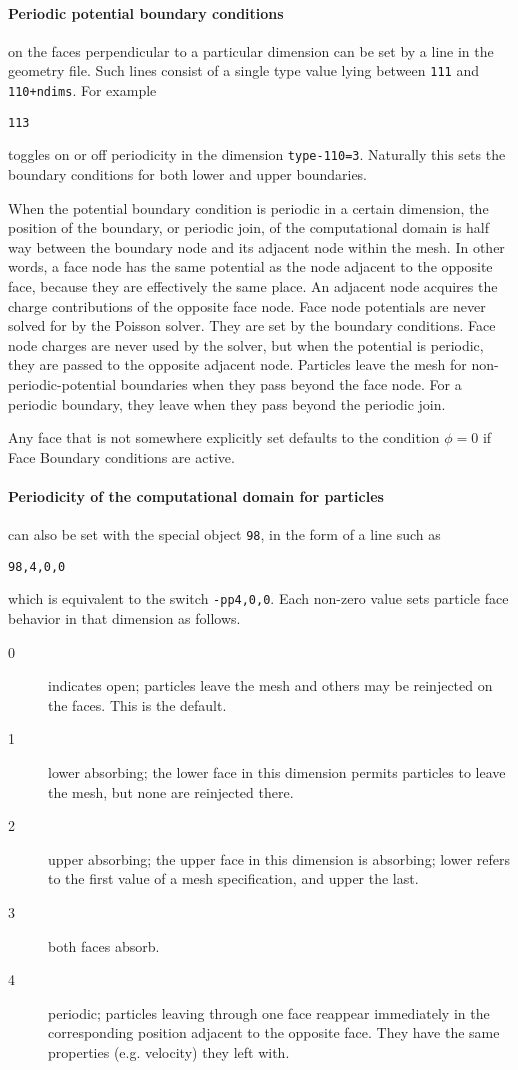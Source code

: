 \documentclass[12pt]{article}
\begin{document}
\paragraph{Periodic potential boundary conditions}
on the faces perpendicular to a particular dimension can be set by a
line in the geometry file. Such lines consist of a single type value lying
between \verb!111! and \verb!110+ndims!. For example
\begin{verbatim}
113
\end{verbatim}
toggles on or off periodicity in the dimension
\verb!type-110=3!. Naturally this sets the boundary conditions for
both lower and upper boundaries. 

When the potential boundary condition is periodic in a certain
dimension, the position of the boundary, or periodic join, of the
computational domain is half way between the boundary node and its
adjacent node within the mesh. In other words, a face node has the
same potential as the node adjacent to the opposite face, because they
are effectively the same place. An adjacent node acquires the charge
contributions of the opposite face node. Face node potentials are
never solved for by the Poisson solver. They are set by the boundary
conditions. Face node charges are never used by the solver, but when
the potential is periodic, they are passed to the opposite adjacent
node. Particles leave the mesh for non-periodic-potential boundaries
when they pass beyond the face node. For a periodic boundary, they
leave when they pass beyond the periodic join.

Any face that is not somewhere explicitly set defaults to the
condition $\phi=0$ if Face Boundary conditions are active.

\paragraph{Periodicity of the computational domain for
  particles}\label{partperiod} can
also be set with the special object \verb!98!, in the form of a line
such as
\begin{verbatim}
98,4,0,0
\end{verbatim} which is equivalent to the switch \verb!-pp4,0,0!.
Each non-zero value sets particle face behavior in that dimension as follows.

\begin{description}
\item[0]  indicates open; particles leave the mesh and others may be
reinjected on the faces. This is the default. 
\item[1] lower absorbing; the lower face in this dimension permits particles
to leave the mesh, but none are reinjected there.
\item[2] upper absorbing; the upper face in this dimension is absorbing;
lower refers to the first value of a mesh specification, and upper the
last.
\item[3] both faces absorb.
\item[4] periodic; particles leaving through one face reappear immediately in the
corresponding position adjacent to the opposite face. They have the same
properties (e.g. velocity) they left with.
\end{description}
\end{document}

